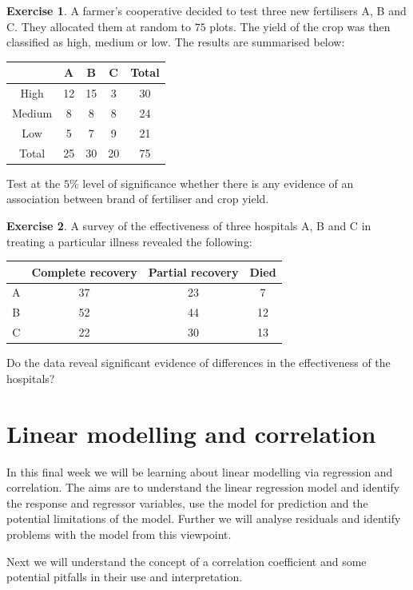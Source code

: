 \documentclass[
]{book}
\theoremstyle{definition}
\theoremstyle{definition}
\theoremstyle{definition}
\newtheorem{exercise}{Exercise}[chapter]
\theoremstyle{definition}
\theoremstyle{remark}
\begin{document}
\begin{exercise}
A farmer's cooperative decided to test three new fertilisers A, B and C. They allocated them at random to \(75\) plots. The yield of the crop was then classified as high, medium or low. The results are summarised below:

\begin{longtable}[]{@{}ccccc@{}}
\toprule
& A & B & C & Total\tabularnewline
\midrule
\endhead
High & 12 & 15 & 3 & 30\tabularnewline
Medium & 8 & 8 & 8 & 24\tabularnewline
Low & 5 & 7 & 9 & 21\tabularnewline
Total & 25 & 30 & 20 & 75\tabularnewline
\bottomrule
\end{longtable}

Test at the \(5\%\) level of significance whether there is any evidence of an association between brand of fertiliser and crop yield.
\end{exercise}

\begin{exercise}
A survey of the effectiveness of three hospitals A, B and C in treating a particular illness revealed the following:

\begin{longtable}[]{@{}cccc@{}}
\toprule
& Complete recovery & Partial recovery & Died\tabularnewline
\midrule
\endhead
A & 37 & 23 & 7\tabularnewline
B & 52 & 44 & 12\tabularnewline
C & 22 & 30 & 13\tabularnewline
\bottomrule
\end{longtable}

Do the data reveal significant evidence of differences in the effectiveness of the hospitals?
\end{exercise}

\hypertarget{linear-modelling-and-correlation}{%
\chapter{Linear modelling and correlation}\label{linear-modelling-and-correlation}}

In this final week we will be learning about linear modelling via regression and correlation. The aims are to understand the linear regression model and identify the response and regressor variables, use the model for prediction and the potential limitations of the model. Further we will analyse residuals and identify problems with the model from this viewpoint.

Next we will understand the concept of a correlation coefficient and some potential pitfalls in their use and interpretation.
\end{document}
